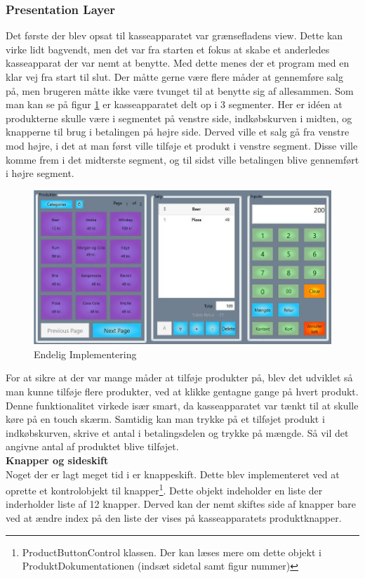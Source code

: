 \subsubsection{Presentation Layer}

Det første der blev opsat til kasseapparatet var grænsefladens view. Dette kan virke lidt bagvendt, men det var fra starten et fokus at skabe et anderledes kasseapparat der var nemt at benytte. Med dette menes der et program med en klar vej fra start til slut. Der måtte gerne være flere måder at gennemføre salg på, men brugeren måtte ikke være tvunget til at benytte sig af allesammen.
Som man kan se på figur \ref{fig:sub2} er kasseapparatet delt op i 3 segmenter. Her er idéen at produkterne skulle være i segmentet på venstre side, indkøbskurven i midten, og knapperne til brug i betalingen på højre side. Derved ville et salg gå fra venstre mod højre, i det at man først ville tilføje et produkt i venstre segment. Disse ville komme frem i det midterste segment, og til sidst ville betalingen blive gennemført i højre segment. 

\begin{figure}[H]
	\centering
	\includegraphics[width=0.9\linewidth]{Projektbeskrivelse/DesignOgImplementering/pics/GUI}
	\caption{Endelig Implementering}
	\label{fig:sub2}
\end{figure}

For at sikre at der var mange måder at tilføje produkter på, blev det udviklet så man kunne tilføje flere produkter, ved at klikke gentagne gange på hvert produkt. Denne funktionalitet virkede især smart, da kasseapparatet var tænkt til at skulle køre på en touch skærm. Samtidig kan man trykke på et tilføjet produkt i indkøbskurven, skrive et antal i betalingsdelen og trykke på mængde. Så vil det angivne antal af produktet blive tilføjet.\\

\textbf{Knapper og sideskift} \\
Noget der er lagt meget tid i er knappeskift. Dette blev implementeret ved at oprette et kontrolobjekt til knapper\footnote{ProductButtonControl klassen. Der kan læses mere om dette objekt i ProduktDokumentationen (indsæt sidetal samt figur nummer)}. Dette objekt indeholder en liste der inderholder liste af 12 knapper. Derved kan der nemt skiftes side af knapper bare ved at ændre index på den liste der vises på kasseapparatets produktknapper.